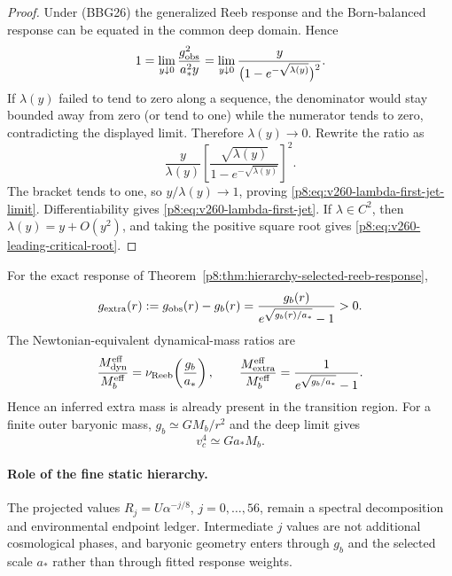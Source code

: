 \documentclass[12pt,a4paper]{article}
\begin{document}
\begin{proof}
Under (BBG26) the generalized Reeb response and the Born-balanced response can
be equated in the common deep domain.  Hence
\[
 1=\lim_{y\downarrow0}
 \frac{g_{\rm obs}^2}{a_*^2y}
 =\lim_{y\downarrow0}
 \frac{y}{\bigl(1-e^{-\sqrt{\lambda(y)}}\bigr)^2}.
\]
If \(\lambda(y)\) failed to tend to zero along a sequence, the denominator
would stay bounded away from zero (or tend to one) while the numerator tends
to zero, contradicting the displayed limit.  Therefore \(\lambda(y)\to0\).
Rewrite the ratio as
\[
 \frac{y}{\lambda(y)}
 \left[
  \frac{\sqrt{\lambda(y)}}{1-e^{-\sqrt{\lambda(y)}}}
 \right]^2.
\]
The bracket tends to one, so \(y/\lambda(y)\to1\), proving
\eqref{p8:eq:v260-lambda-first-jet-limit}.  Differentiability gives
\eqref{p8:eq:v260-lambda-first-jet}.  If \(\lambda\in C^2\), then
\(\lambda(y)=y+O(y^2)\), and taking the positive square root gives
\eqref{p8:eq:v260-leading-critical-root}.
\end{proof}

\begin{corollary}
\label{p8:cor:rar-apparent-mass-btfr}
For the exact response of Theorem~\ref{p8:thm:hierarchy-selected-reeb-response},
\begin{equation}
\label{p8:eq:apparent-extra-acceleration}
g_{\rm extra}(r)
:=g_{\rm obs}(r)-g_b(r)
=\frac{g_b(r)}{e^{\sqrt{g_b(r)/a_*}}-1}>0.
\end{equation}
The Newtonian-equivalent dynamical-mass ratios are
\begin{equation}
\label{p8:eq:apparent-extra-mass-ratio}
\frac{M_{\rm dyn}^{\rm eff}}{M_b^{\rm eff}}
=\nu_{\rm Reeb}\!\left(\frac{g_b}{a_*}\right),
\qquad
\frac{M_{\rm extra}^{\rm eff}}{M_b^{\rm eff}}
=\frac{1}{e^{\sqrt{g_b/a_*}}-1}.
\end{equation}
Hence an inferred extra mass is already present in the transition region.  For a finite outer baryonic mass, $g_b\simeq GM_b/r^2$ and the deep limit gives
\begin{equation}
\label{p8:eq:btfr-from-full-kernel}
v_c^4\simeq Ga_*M_b.
\end{equation}
\end{corollary}

\paragraph{Role of the fine static hierarchy.}
The projected values $R_j=U\alpha^{-j/8}$, $j=0,\ldots,56$, remain a spectral decomposition and environmental endpoint ledger.  Intermediate $j$ values are not additional cosmological phases, and baryonic geometry enters through $g_b$ and the selected scale $a_*$ rather than through fitted response weights.
\end{document}
